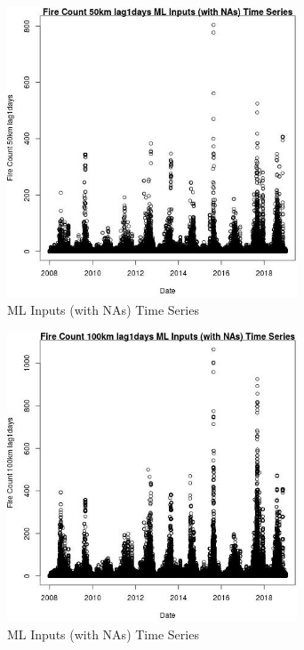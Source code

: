 \begin{figure} 
\centering  
\includegraphics[width=0.77\textwidth]{Code_Outputs/Report_ML_input_PM25_Step4_part_f_de_duplicated_aves_prioritize_24hr_obswNAs_Fire_Count_50km_lag1daysvDate.jpg} 
\caption{\label{fig:Report_ML_input_PM25_Step4_part_f_de_duplicated_aves_prioritize_24hr_obswNAsFire_Count_50km_lag1daysvDate}ML Inputs (with NAs) Time Series} 
\end{figure} 
 

\begin{figure} 
\centering  
\includegraphics[width=0.77\textwidth]{Code_Outputs/Report_ML_input_PM25_Step4_part_f_de_duplicated_aves_prioritize_24hr_obswNAs_Fire_Count_100km_lag1daysvDate.jpg} 
\caption{\label{fig:Report_ML_input_PM25_Step4_part_f_de_duplicated_aves_prioritize_24hr_obswNAsFire_Count_100km_lag1daysvDate}ML Inputs (with NAs) Time Series} 
\end{figure} 
 

